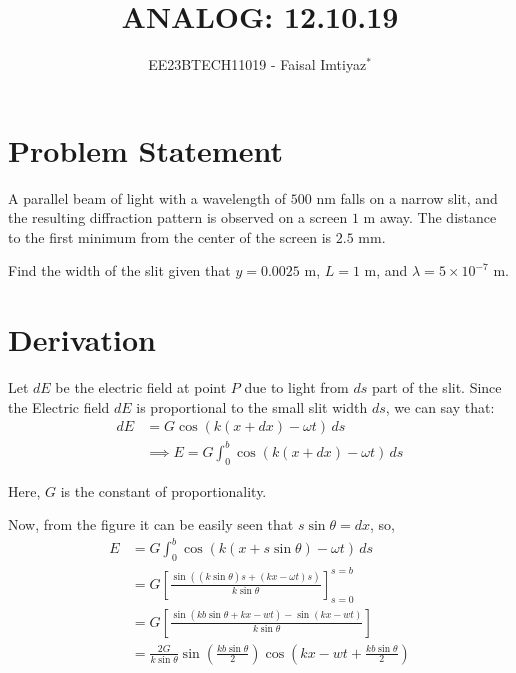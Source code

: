 \documentclass[journal,12pt,twocolumn]{IEEEtran}
\theoremstyle{remark}
\begin{document}
\title{ANALOG: 12.10.19}
\author{EE23BTECH11019 - Faisal Imtiyaz$^{*}$}%
\maketitle

\section{Problem Statement}

A parallel beam of light with a wavelength of $500$ nm falls on a narrow slit, and the resulting diffraction pattern is observed on a screen $1$ m away. The distance to the first minimum from the center of the screen is $2.5$ mm.

Find the width of the slit given that $y = 0.0025$ m, $L = 1$ m, and $\lambda = 5 \times 10^{-7}$ m.\\


\section{Derivation}


Let $dE$ be the electric field at point $P$ due to light from $ds$ part of the slit. Since the Electric field $dE$ is proportional to the small slit width $ds$, we can say that:
\begin{align*}
dE &= G \cos(k(x+dx) - \omega t) \, ds \\
&\implies E = G \int_{0}^{b} \cos(k(x+dx) - \omega t) \, ds
\end{align*}

Here, $G$ is the constant of proportionality.

Now, from the figure it can be easily seen that $s\sin\theta = dx$, so,
\begin{align*}
E &= G \int_{0}^{b} \cos(k(x+s\sin\theta) - \omega t) \, ds \\
&= G \left[\frac{\sin((k \sin\theta) s + (kx - \omega t)s)}{k \sin\theta}\right]_{s=0}^{s=b} \\
&= G\left[\frac{\sin(kb\sin\theta+kx-wt)-\sin(kx-wt)}{k\sin\theta}\right] \\
&= \frac{2G}{k\sin\theta}\sin\left(\frac{kb\sin\theta}{2}\right)\cos\left(kx-wt+\frac{kb\sin\theta}{2}\right)
\end{align*}
\end{document}
